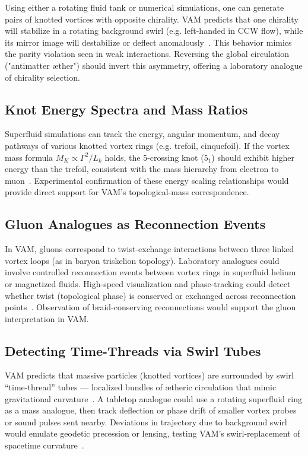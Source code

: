 \documentclass[11pt]{article}
\begin{document}
Using either a rotating fluid tank or numerical simulations, one can generate pairs of knotted vortices with opposite chirality. VAM predicts that one chirality will stabilize in a rotating background swirl (e.g. left-handed in CCW flow), while its mirror image will destabilize or deflect anomalously~\cite{iskandarani2025vam5}. This behavior mimics the parity violation seen in weak interactions. Reversing the global circulation ("antimatter æther") should invert this asymmetry, offering a laboratory analogue of chirality selection.

\subsection*{Knot Energy Spectra and Mass Ratios}

Superfluid simulations can track the energy, angular momentum, and decay pathways of various knotted vortex rings (e.g. trefoil, cinquefoil). If the vortex mass formula $M_K \propto \Gamma^2 / L_k$ holds, the 5-crossing knot ($5_1$) should exhibit higher energy than the trefoil, consistent with the mass hierarchy from electron to muon~\cite{iskandarani2025vam5}. Experimental confirmation of these energy scaling relationships would provide direct support for VAM’s topological-mass correspondence.

\subsection*{Gluon Analogues as Reconnection Events}

In VAM, gluons correspond to twist-exchange interactions between three linked vortex loops (as in baryon triskelion topology). Laboratory analogues could involve controlled reconnection events between vortex rings in superfluid helium or magnetized fluids. High-speed visualization and phase-tracking could detect whether twist (topological phase) is conserved or exchanged across reconnection points~\cite{iskandarani2025vam5}. Observation of braid-conserving reconnections would support the gluon interpretation in VAM.

\subsection*{Detecting Time-Threads via Swirl Tubes}

VAM predicts that massive particles (knotted vortices) are surrounded by swirl “time-thread” tubes — localized bundles of ætheric circulation that mimic gravitational curvature~\cite{iskandarani2025vam2}. A tabletop analogue could use a rotating superfluid ring as a mass analogue, then track deflection or phase drift of smaller vortex probes or sound pulses sent nearby. Deviations in trajectory due to background swirl would emulate geodetic precession or lensing, testing VAM’s swirl-replacement of spacetime curvature~\cite{iskandarani2025vam2}.
\end{document}
